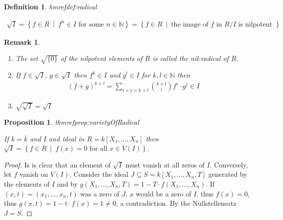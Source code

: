 \documentclass[DIV=14,parskip=full,pointednumbers]{scrartcl}
\newenvironment{alphanumerate}{\begin{enumerate}[label={\upshape(\alph*)}]}{\end{enumerate}}
\theoremstyle{cthm}
\newtheorem{prop}{Proposition}[subsection]
\theoremstyle{cdef}
\newtheorem{defi}{Definition}[subsection]
\newtheorem*{rem*}{Remark}
\newcommand{\lbl}[1]{
	\label{#1}
	\edef\dummy{\curthm}
	\expandafter\xdef\csname thmref#1\endcsname{\dummy}
}
\newcommand{\IN}{\mathbb{N}}
\newcommand{\st}{\ \middle|\ }
\begin{document}
\begin{defi}\lbl{def:radical}
 \begin{align*}
  \sqrt{I} = \left\{f\in R\st f^n\in I \text{ for some }n\in \IN\right\} = \left\{f\in R\st \text{the image of } f\text{ in } R/I \text{ is nilpotent }\right\}
 \end{align*}

\end{defi}

\begin{rem*}
 \begin{alphanumerate}
  \item The set $\sqrt{\{0\}}$ of the nilpotent elements of $R$ is called the \emph{nil-radical} of $R$.
  \item If $f\in \sqrt{I}$, $g\in\sqrt{I}$ then $f^k\in I$ and $g^l\in I$ for $k,l\in \IN$ then
  \begin{align*}
  (f+g)^{k+l} =\sum_{i+j=k+l} \binom{k+l}{i} f^i\cdot g^{j}\in I
  \end{align*}
  \item $\sqrt{\sqrt{I}}  = \sqrt{I}$
 \end{alphanumerate}

\end{rem*}

\begin{prop}\lbl{prop:varietyOfRadical}
 If $k=\overline{k}$ and $I$ and ideal in $R=k[X_1,\ldots,X_n]$ then $\sqrt{I} = \left\{f\in R\st f(x) = 0 \text{ for all } x\in V(I)\right\}$.
\end{prop}
\begin{proof}
 Is is clear that an element of $\sqrt{I}$ must vanish at all zeros of $I$. Conversely, let $f$ vanish on $V(I)$. Consider the ideal $J\subseteq S = k[X_1,\ldots, X_n, T]$ generated by the elements of $I$ and by $g(X_1,\ldots, X_n, T) = 1-T\cdot f(X_1,\ldots,X_n)$. If $(x,t) = (x_1,\ldots,x_n,t)$ was a zero of $J$, $x$ would be a zero of $I$, thus $f(x)=0$, thus $g(x,t) = 1-t\cdot f(x) = 1\neq 0$, a contradiction. By the Nullstellensatz $J=S$.
\end{proof}
\end{document}
